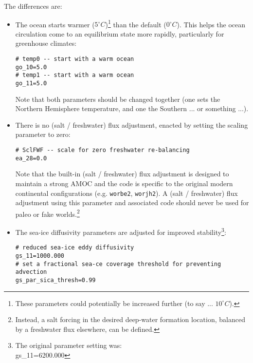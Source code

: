 \documentclass[11pt,fleqn]{book} %
\begin{document}
\begin{itemize}[noitemsep]
The differences are:
\begin{itemize}[noitemsep]
\vspace{1mm}
\item The ocean starts warmer (\(5^{\circ}C\))\footnote{These parameters could potentially be increased further (to say ...  \(10^{\circ}C\)).} than the default (\(0^{\circ}C\)). This helps the ocean circulation come to an equilibrium state more rapidly, particularly for greenhouse climates:
\small\vspace{-2pt}\begin{verbatim}
# temp0 -- start with a warm ocean
go_10=5.0
# temp1 -- start with a warm ocean
go_11=5.0
\end{verbatim}\vspace{-2pt}\normalsize
Note that both parameters should be changed together (one sets the Northern Hemisphere temperature, and one the Southern ... or something ...).
\vspace{1mm}
\item There is no (salt / freshwater) flux adjustment, enacted by setting the scaling parameter to zero:
\small\vspace{-2pt}\begin{verbatim}
# SclFWF -- scale for zero freshwater re-balancing
ea_28=0.0
\end{verbatim}\vspace{-2pt}\normalsize
Note that the built-in (salt / freshwater) flux adjustment is designed to maintain a strong AMOC and the code is specific to the original modern continental configurations (e.g. \texttt{worbe2}, \texttt{worjh2}). A (salt / freshwater) flux adjustment using this parameter and associated code should never be used for paleo or fake worlds.\footnote{Instead, a salt forcing in the desired deep-water formation location, balanced by a freshwater flux elsewhere, can be defined.}
\vspace{1mm}
\item The sea-ice diffusivity parameters are adjusted for improved stability\footnote{The original parameter setting was:
\\gs\_11=6200.000}:
\small\vspace{-2pt}\begin{verbatim}
# reduced sea-ice eddy diffusivity
gs_11=1000.000
# set a fractional sea-ce coverage threshold for preventing advection
gs_par_sica_thresh=0.99
\end{verbatim}\vspace{-2pt}\normalsize
\vspace{1mm}

\end{itemize}
\end{itemize}
\end{document}
